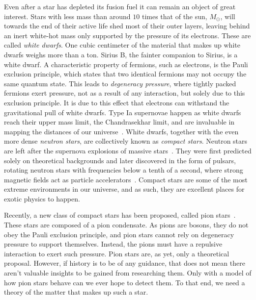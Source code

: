 Even after a star has depleted its fusion fuel it can remain an object of great interest.
Stars with less mass than around $10$ times that of the sun, $M_\odot$, will towards the end of their active life shed most of their outer layers, leaving behind an inert white-hot mass only supported by the pressure of its electrons.
These are called \emph{white dwarfs}.
One cubic centimeter of the material that makes up white dwarfs weighs more than a ton.
Sirius B, the fainter companion to Sirius, is a white dwarf.
A characteristic property of fermions, such as electrons, is the Pauli exclusion principle, which states that two identical fermions may not occupy the same quantum state.
This leads to \emph{degeneracy pressure}, where tightly packed fermions exert pressure, not as a result of any interaction, but solely due to this exclusion principle.
It is due to this effect that electrons can withstand the gravitational pull of white dwarfs.
Type Ia supernovae happen as white dwarfs reach their upper mass limit, the Chandrasekhar limit, and are invaluable in mapping the distances of our universe~\autocite{carrollSpacetimeGeometryIntroduction2019}.
White dwarfs, together with the even more dense \emph{neutron stars}, are collectively known as \emph{compact stars}.
Neutron stars are left after the supernova explosions of massive stars~\autocite{prialnikIntroductionTheoryStellar2000}.
They were first predicted solely on theoretical backgrounds and later discovered in the form of pulsars, rotating neutron stars with frequencies below a tenth of a second, where strong magnetic fields act as particle accelerators~\autocite{prialnikIntroductionTheoryStellar2000}.
Compact stars are some of the most extreme environments in our universe, and as such, they are excellent places for exotic physics to happen.

Recently, a new class of compact stars has been proposed, called pion stars~\autocite{andersenBoseEinsteinCondensationPion2018,brandtNewClassCompact2018,carignanoScrutinizingPionCondensed2017}.
These stars are composed of a pion condensate.
As pions are bosons, they do not obey the Pauli exclusion principle, and pion stars cannot rely on degeneracy pressure to support themselves.
Instead, the pions must have a repulsive interaction to exert such pressure.
Pion stars are, as yet, only a theoretical proposal.
However, if history is to be of any guidance, that does not mean there aren't valuable insights to be gained from researching them.
Only with a model of how pion stars behave can we ever hope to detect them.
To that end, we need a theory of the matter that makes up such a star.





